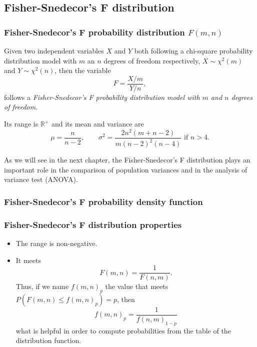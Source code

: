 \subsection{Fisher-Snedecor's F distribution}

\begin{frame}
\frametitle{Fisher-Snedecor's F probability distribution $F(m,n)$}
\begin{definition}
Given two independent variables $X$ and $Y$ both following a chi-square probability distribution model with $m$ an $n$
degrees of freedom respectively,  $X\sim \chi^2(m)$ and $Y\sim \chi^2(n)$, then the variable
\[
F = \frac{X/m}{Y/n},
\]
follows a \emph{Fisher-Snedecor's F probability distribution model with $m$ and $n$ degrees of freedom}.
\end{definition}

Its range is $\mathbb{R}^+$ and its mean and variance are
\[
\mu = \frac{n}{n-2}, \qquad \sigma^2 =\frac{2n^2(m+n−2)}{m(n-2)^2(n-4)}\mbox{ if $n>4$}.
\]

As we will see in the next chapter, the Fisher-Snedecor's F distribution plays an important role in the comparison of
population variances and in the analysis of variance test (ANOVA).
\end{frame}


\begin{frame}
\frametitle{Fisher-Snedecor's F probability density function}

\begin{center}
\end{center}
\end{frame}


\begin{frame}
\frametitle{Fisher-Snedecor's F distribution properties}
\begin{itemize}
\item The range is non-negative.
\item It meets
\[
F(m,n) =\frac{1}{F(n,m)}.
\]
Thus, if we name $f(m,n)_p$ the value that meets $P(F(m,n)\leq f(m,n)_p)=p$, then
\[
f(m,n)_p =\frac{1}{f(n,m)_{1-p}}
\]
what is helpful in order to compute probabilities from the table of the distribution function.
\end{itemize}
\end{frame}